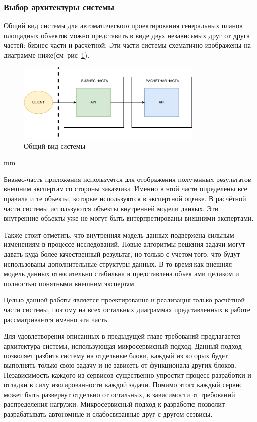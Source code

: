 \subsubsection{\large{Выбор архитектуры системы}}

Общий вид системы для автоматического проектирования генеральных планов площадных объектов можно представить в виде
двух независимых друг от друга частей: бизнес-части и расчётной.
Эти части системы схематично изображены на диаграмме ниже(см. рис\ \ref{pic:architecture__system-diagram}).

\begin{figure}[H]
	\hspace*{-2.5 cm}\includegraphics[width=0.8\textwidth, left]{architecture/pictures/common/system}
	\caption{Общий вид системы}
	\label{pic:architecture__system-diagram}
\end{figure}
 mm

Бизнес-часть приложения используется для отображения полученных результатов внешним экспертам со стороны заказчика.
Именно в этой части определены все правила и те объекты, которые используются в экспертной оценке.
В расчётной части системы используются объекты внутренней модели данных.
Эти внутренние объекты уже не могут быть интерпретированы внешними экспертами.

Также стоит отметить, что внутренняя модель данных подвержена сильным изменениям в процессе исследований.
Новые алгоритмы решения задачи могут давать куда более качественный результат, но только с учетом того, что
будут использованы дополнительные структуры данных. В то время как внешняя модель данных относительно стабильна
и представлена объектами целиком и полностью понятными внешним экспертам.

Целью данной работы является проектирование и реализация только расчётной части системы, поэтому на всех остальных
диаграммах представленных в работе рассматривается именно эта часть.

Для удовлетворения описанных в предыдущей главе требований предлагается архитектура системы,
использующая микросервисный подход. Данный подход позволяет разбить систему на отдельные блоки,
каждый из которых будет выполнять только свою задачу и не зависеть от функционала других блоков.
Независимость каждого из сервисов существенно упростит процесс разработки и отладки в силу изолированности
каждой задачи. Помимо этого каждый сервис может быть развернут отдельно от остальных, в зависимости
от требований распределения нагрузки. Микросервисный подход к разработке позволит разрабатывать
автономные и слабосвязанные друг с другом сервисы.

